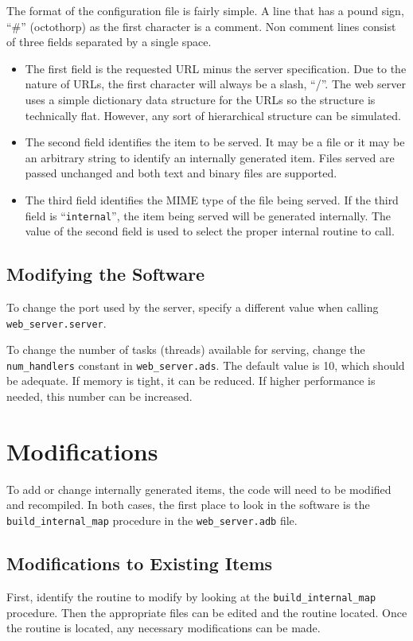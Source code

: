 \documentclass[10pt, openany]{book}
\begin{document}
The format of the configuration file is fairly simple.  A line that has a pound sign, ``\#'' (octothorp) as the first character is a comment.  Non comment lines consist of three fields separated by a single space.
\begin{itemize}
  \item The first field is the requested URL minus the server specification.  Due to the nature of URLs, the first character will always be a slash, ``/''.  The web server uses a simple dictionary data structure for the URLs so the structure is technically flat.  However, any sort of hierarchical structure can be simulated.
  \item The second field identifies the item to be served.  It may be a file or it may be an arbitrary string to identify an internally generated item.  Files served are passed unchanged and both text and binary files are supported.
  \item The third field identifies the MIME type of the file being served.  If the third field is ``\texttt{internal}'', the item being served will be generated internally.  The value of the second field is used to select the proper internal routine to call.
\end{itemize}

\subsection{Modifying the Software}
To change the port used by the server, specify a different value when calling \texttt{web\_server.server}.

To change the number of tasks (threads) available for serving, change the \texttt{num\_handlers} constant in \texttt{web\_server.ads}.  The default value is 10, which should be adequate.  If memory is tight, it can be reduced. If higher performance is needed, this number can be increased.

\section{Modifications}
To add or change internally generated items, the code will need to be modified and recompiled.  In both cases, the first place to look in the software is the \texttt{build\_internal\_map} procedure in the \texttt{web\_server.adb} file.

\subsection{Modifications to Existing Items}
First, identify the routine to modify by looking at the \texttt{build\_internal\_map} procedure.  Then the appropriate files can be edited and the routine located.  Once the routine is located, any necessary modifications can be made.
\end{document}
